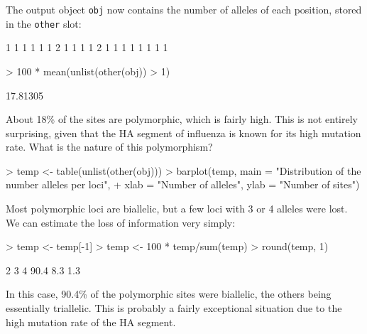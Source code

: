 \documentclass{article}
\begin{document}
\noindent The output object \texttt{obj} now contains the number of alleles of each position, stored
in the \texttt{other} slot:
\begin{Schunk}
\begin{Soutput}
 [1] 1 1 1 1 1 1 2 1 1 1 1 2 1 1 1 1 1 1 1 1
\end{Soutput}
\begin{Sinput}
> 100 * mean(unlist(other(obj)) > 1)
\end{Sinput}
\begin{Soutput}
[1] 17.81305
\end{Soutput}
\end{Schunk}
About 18\% of the sites are polymorphic, which is fairly high.
This is not entirely surprising, given that the HA segment of influenza is known for its high
mutation rate.
What is the nature of this polymorphism?
\begin{Schunk}
\begin{Sinput}
> temp <- table(unlist(other(obj)))
> barplot(temp, main = "Distribution of the number \nof alleles per loci", 
+     xlab = "Number of alleles", ylab = "Number of sites")
\end{Sinput}
\end{Schunk}
Most polymorphic loci are biallelic, but a few loci with 3 or 4 alleles were lost.
We can estimate the loss of information very simply:
\begin{Schunk}
\begin{Sinput}
> temp <- temp[-1]
> temp <- 100 * temp/sum(temp)
> round(temp, 1)
\end{Sinput}
\begin{Soutput}
   2    3    4 
90.4  8.3  1.3 
\end{Soutput}
\end{Schunk}
In this case, 90.4\% of the polymorphic sites were biallelic, the others being
essentially triallelic.
This is probably a fairly exceptional situation due to the high mutation rate of the HA segment.


\end{document}

